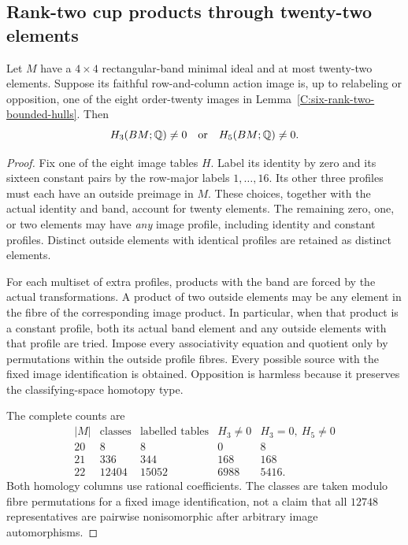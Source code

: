 \subsection{Rank-two cup products through twenty-two elements}

\begin{lemma}
\label{B:eight-rank-two-image-inflations}
Let $M$ have a $4\times4$ rectangular-band minimal ideal and at
most twenty-two elements. Suppose its faithful row-and-column
action image is, up to relabeling or opposition, one of the eight
order-twenty images in Lemma~\ref{C:six-rank-two-bounded-hulls}.
Then
\[
 H_3(BM;\mathbb Q)\ne0
 \quad\hbox{or}\quad
 H_5(BM;\mathbb Q)\ne0.
\]
\end{lemma}
\begin{proof}
Fix one of the eight image tables $H$. Label its identity by zero
and its sixteen constant pairs by the row-major labels $1,\ldots,16$.
Its other three profiles must each have an outside preimage in $M$.
These choices, together with the actual identity and band, account
for twenty elements. The remaining zero, one, or two elements may
have \emph{any} image profile, including identity and constant
profiles. Distinct outside elements with identical profiles are
retained as distinct elements.

For each multiset of extra profiles, products with the band are
forced by the actual transformations. A product of two outside
elements may be any element in the fibre of the corresponding
image product. In particular, when that product is a constant
profile, both its actual band element and any outside elements
with that profile are tried. Impose every associativity equation
and quotient only by permutations within the outside profile
fibres. Every possible source with the fixed image identification
is obtained. Opposition is harmless because it preserves the
classifying-space homotopy type.

The complete counts are
\[
\begin{array}{c|r|r|r|r}
 |M|&\text{classes}&\text{labelled tables}
     &H_3\ne0&H_3=0,\ H_5\ne0\\\hline
 20&8&8&0&8\\
 21&336&344&168&168\\
 22&12404&15052&6988&5416.
\end{array}
\]
Both homology columns use rational coefficients. The classes
are taken modulo fibre permutations for a fixed image identification, not a claim
that all $12748$ representatives are pairwise nonisomorphic after
arbitrary image automorphisms.


\end{proof}
